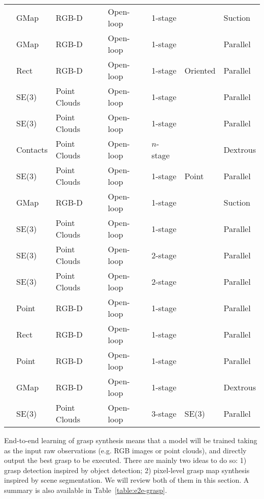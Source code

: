 \documentclass[letterpaper,10pt]{article}
\newcommand{\xmark}{\ding{55}}%
\newcommand{\tabref}[1]{Table~\ref{#1}}
\begin{document}
\begin{table}[t]
\begin{center}
\begin{tabularx}{1\columnwidth}{m{3.6cm}m{2cm}<{\centering}m{1.8cm}<{\centering}m{1.6cm}<{\centering}m{1.6cm}<{\centering}m{1.2cm}<{\centering}m{1.2cm}<{\centering}}
\cite{shao2019suction} & GMap & RGB-D & Open-loop & 1-stage & \xmark & Suction\\
\cite{chalvatzaki2020orientation} & GMap & RGB-D & Open-loop & 1-stage & \xmark & Parallel\\
\cite{zhang2019real} & Rect & RGB-D & Open-loop & 1-stage & Oriented & Parallel \\
\cite{ni2020pointnet++} & SE(3) & Point Clouds & Open-loop & 1-stage & \xmark & Parallel \\
\cite{qin2020s4g} & SE(3) & Point Clouds & Open-loop & 1-stage & \xmark & Parallel \\
\cite{shao2020unigrasp} & Contacts & Point Clouds & Open-loop & $n$-stage & \xmark & Dextrous \\
\cite{wu2020grasp} & SE(3) & Point Clouds & Open-loop & 1-stage & Point & Parallel \\
\cite{cao2021suctionnet} & GMap & RGB-D & Open-loop & 1-stage & \xmark & Suction \\
\cite{sundermeyer2021contact} & SE(3) & Point Clouds & Open-loop & 1-stage & \xmark & Parallel \\
\cite{wang2021graspness} & SE(3) & Point Clouds & Open-loop & 2-stage & \xmark & Parallel \\
\cite{wei2021gpr} & SE(3) & Point Clouds & Open-loop & 2-stage & \xmark & Parallel \\
\cite{wang2021double} & Point & RGB-D & Open-loop & 1-stage & \xmark & Parallel \\
\cite{wu2021real} & Rect & RGB-D & Open-loop & 1-stage & \xmark & Parallel \\
\cite{xu2021gknet} & Point & RGB-D & Open-loop & 1-stage & \xmark & Parallel \\
\cite{xu2021adagrasp} & GMap & RGB-D & Open-loop & 1-stage & \xmark & Dextrous \\
\cite{zhao2021regnet} & SE(3) & Point Clouds & Open-loop & 3-stage & SE(3) & Parallel \\

\bottomrule
\end{tabularx}
\end{center}
\vspace{-15pt}
\end{table}



End-to-end learning of grasp synthesis means that a model will be trained taking as the input raw observations (e.g. RGB images or point clouds), and directly output the best grasp to be executed.
There are mainly two ideas to do so: 1) grasp detection inspired by object detection; 2) pixel-level grasp map synthesis inspired by scene segmentation.
We will review both of them in this section.
A summary is also available in \tabref{table:e2e-grasp}.
\end{document}

